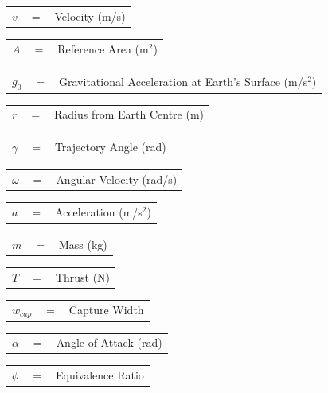 \documentclass[]{aiaa-tc}
\begin{document}
	  	\begin{tabular}{p{1.2cm}p{1cm}p{5cm}}
	  $v$ & $=$ & Velocity (m/s)\\
	  	\end{tabular} 
	  	\begin{tabular}{p{1.2cm}p{1cm}p{5cm}}
	  $A$ & $=$ & Reference Area (m$^2$)\\
	  	\end{tabular} 
	  	\begin{tabular}{p{1.2cm}p{1cm}p{5cm}}
	  		$g_0$ & $=$ & Gravitational Acceleration at Earth's Surface (m/s$^2$)\\
	  	\end{tabular} 
	  	\begin{tabular}{p{1.2cm}p{1cm}p{5cm}}

	
	$r$ & $=$ & Radius from Earth Centre (m)\\
		\end{tabular} 
		\begin{tabular}{p{1.2cm}p{1cm}p{5cm}}
	  $\gamma$ & $=$ & Trajectory Angle (rad)\\
	  	\end{tabular} 
	  	\begin{tabular}{p{1.2cm}p{1cm}p{5cm}}
	  $\omega$ & $=$ & Angular Velocity (rad/s)\\
	  	\end{tabular} 
	  	\begin{tabular}{p{1.2cm}p{1cm}p{5cm}}
	  $a$ & $=$ & Acceleration (m/s$^2$)\\
	  	\end{tabular} 
	  	\begin{tabular}{p{1.2cm}p{1cm}p{5cm}}
	  $m$ & $=$ & Mass (kg)\\
	  	\end{tabular} 
	  	\begin{tabular}{p{1.2cm}p{1cm}p{5cm}}
	  $T$ & $=$ & Thrust (N)\\
	  	\end{tabular} 
	  	\begin{tabular}{p{1.2cm}p{1cm}p{5cm}}
	  $w_{cap}$ & $=$ & Capture Width\\
	  	\end{tabular} 
	  	\begin{tabular}{p{1.2cm}p{1cm}p{5cm}}
	  		$\alpha$ & $=$ & Angle of Attack (rad)\\
	  	\end{tabular} 	
	  	\begin{tabular}{p{1.2cm}p{1cm}p{5cm}}
	  		$\phi$ & $=$ & Equivalence Ratio\\
	  	\end{tabular} 
\end{document}
